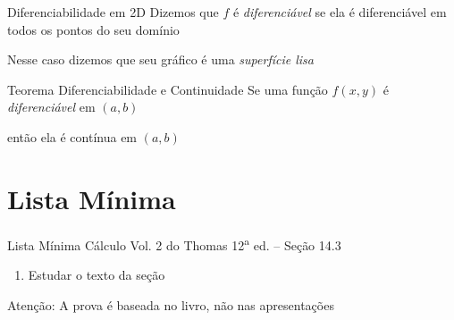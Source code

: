 \documentclass[fleqn,utf8,aspectratio=169,12pt]{beamer}
\begin{document}
\begin{frame}{Diferenciabilidade em 2D}
  Dizemos que $f$ é \emph{diferenciável}
  se ela é diferenciável em todos os
  pontos do seu domínio

  \pause
  \vspace{0.5\baselineskip}
  Nesse caso dizemos que seu gráfico é uma \emph{superfície lisa}
\end{frame}

\begin{frame}{Teorema Diferenciabilidade e Continuidade}
    Se uma função $f(x, y)$ é \emph{diferenciável} em \((a, b)\)

    \pause
    \vspace{0.5\baselineskip}
    então ela é contínua em \((a, b)\)
\end{frame}

\section{Lista Mínima}

\begin{frame}{Lista Mínima}
  Cálculo Vol. 2 do Thomas 12\textsuperscript{a} ed. -- Seção 14.3
  \begin{enumerate}
    \item Estudar o texto da seção
  \end{enumerate}

  \vfill
  Atenção: A prova é baseada no livro, não nas apresentações
\end{frame}

\end{document}
